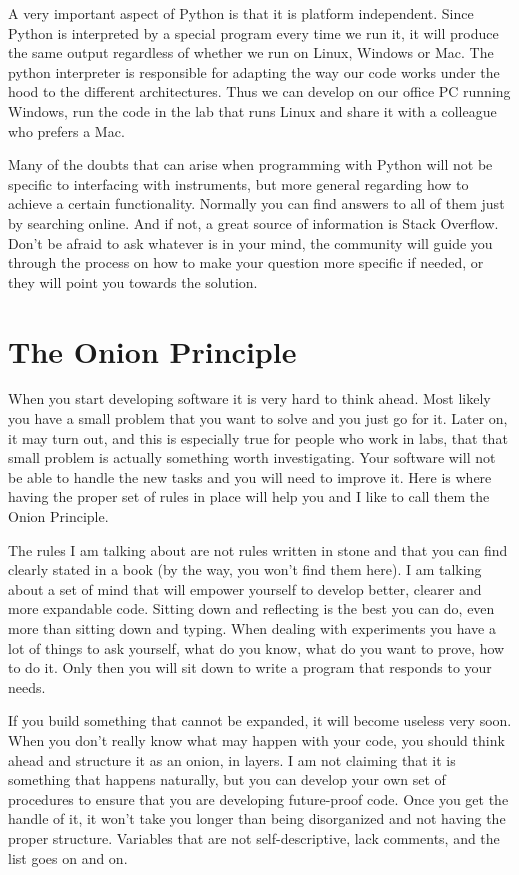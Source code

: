 A very important aspect of Python is that it is platform independent. Since Python is interpreted by a special program every time we run it, it will produce the same output regardless of whether we run on Linux, Windows or Mac. The python interpreter is responsible for adapting the way our code works under the hood to the different architectures. Thus we can develop on our office PC running Windows, run the code in the lab that runs Linux and share it with a colleague who prefers a Mac.

Many of the doubts that can arise when programming with Python will not be specific to interfacing with instruments, but more general regarding how to achieve a certain functionality. Normally you can find answers to all of them just by searching online. And if not, a great source of information is Stack Overflow. Don’t be afraid to ask whatever is in your mind, the community will guide you through the process on how to make your question more specific if needed, or they will point you towards the solution.

\section{The Onion Principle}

When you start developing software it is very hard to think ahead. Most likely you have a small problem that you want to solve and you just go for it. Later on, it may turn out, and this is especially true for people who work in labs, that that small problem is actually something worth investigating. Your software will not be able to handle the new tasks and you will need to improve it. Here is where having the proper set of rules in place will help you and I like to call them the Onion Principle.

The rules I am talking about are not rules written in stone and that you can find clearly stated in a book (by the way, you won’t find them here). I am talking about a set of mind that will empower yourself to develop better, clearer and more expandable code. Sitting down and reflecting is the best you can do, even more than sitting down and typing. When dealing with experiments you have a lot of things to ask yourself, what do you know, what do you want to prove, how to do it. Only then you will sit down to write a program that responds to your needs.

If you build something that cannot be expanded, it will become useless very soon. When you don’t really know what may happen with your code, you should think ahead and structure it as an onion, in layers. I am not claiming that it is something that happens naturally, but you can develop your own set of procedures to ensure that you are developing future-proof code. Once you get the handle of it, it won’t take you longer than being disorganized and not having the proper structure. Variables that are not self-descriptive, lack comments, and the list goes on and on.

